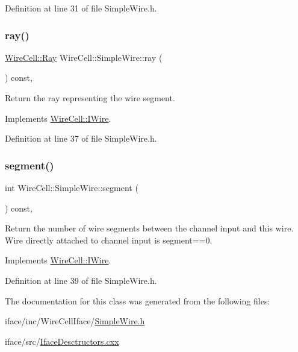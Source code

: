 Definition at line 31 of file Simple\+Wire.\+h.

\mbox{\label{class_wire_cell_1_1_simple_wire_a428dfadc5733bf94b4a422762e55b7f7}} 
\subsubsection{\texorpdfstring{ray()}{ray()}}
{\footnotesize\ttfamily \hyperlink{namespace_wire_cell_a3ab20d9b438feb7eb1ffaab9ba98af0c}{Wire\+Cell\+::\+Ray} Wire\+Cell\+::\+Simple\+Wire\+::ray (\begin{DoxyParamCaption}{ }\end{DoxyParamCaption}) const\hspace{0.3cm}{\ttfamily [inline]}, {\ttfamily [virtual]}}



Return the ray representing the wire segment. 



Implements \hyperlink{class_wire_cell_1_1_i_wire_aded43e813ce82b02e7fc0316d11cfa43}{Wire\+Cell\+::\+I\+Wire}.



Definition at line 37 of file Simple\+Wire.\+h.

\mbox{\label{class_wire_cell_1_1_simple_wire_a965be3ecc234084376422ef89af0958c}} 
\subsubsection{\texorpdfstring{segment()}{segment()}}
{\footnotesize\ttfamily int Wire\+Cell\+::\+Simple\+Wire\+::segment (\begin{DoxyParamCaption}{ }\end{DoxyParamCaption}) const\hspace{0.3cm}{\ttfamily [inline]}, {\ttfamily [virtual]}}

Return the number of wire segments between the channel input and this wire. Wire directly attached to channel input is segment==0. 

Implements \hyperlink{class_wire_cell_1_1_i_wire_a8628e5620e63e66790635b59ed8076ce}{Wire\+Cell\+::\+I\+Wire}.



Definition at line 39 of file Simple\+Wire.\+h.



The documentation for this class was generated from the following files\+:\begin{DoxyCompactItemize}
\item 
iface/inc/\+Wire\+Cell\+Iface/\hyperlink{_simple_wire_8h}{Simple\+Wire.\+h}\item 
iface/src/\hyperlink{_iface_desctructors_8cxx}{Iface\+Desctructors.\+cxx}\end{DoxyCompactItemize}
